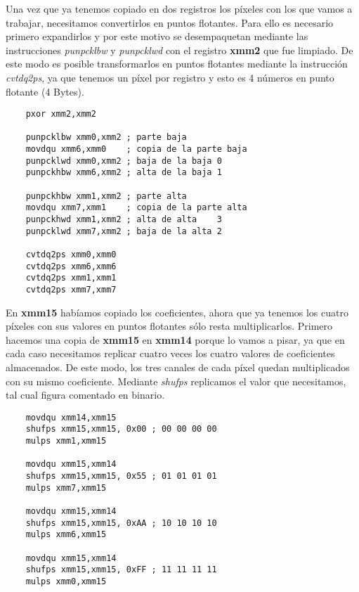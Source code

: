 \documentclass[a4paper]{article}
\begin{document}
\indent Una vez que ya tenemos copiado en dos registros los p\'ixeles con los que vamos a trabajar, necesitamos convertirlos en puntos flotantes. Para ello es necesario primero expandirlos y por este motivo se desempaquetan mediante las instrucciones \textit{punpcklbw} y \textit{punpcklwd} con el registro \textbf{xmm2} que fue limpiado. De este modo es posible transformarlos en puntos flotantes mediante la instrucci\'on \textit{cvtdq2ps}, ya que tenemos un p\'ixel por registro y esto es 4 n\'umeros en punto flotante (4 Bytes).
 \begin{codesnippet}
\begin{verbatim}
    pxor xmm2,xmm2

    punpcklbw xmm0,xmm2 ; parte baja 
    movdqu xmm6,xmm0    ; copia de la parte baja
    punpcklwd xmm0,xmm2 ; baja de la baja 0 
    punpckhbw xmm6,xmm2 ; alta de la baja 1

    punpckhbw xmm1,xmm2 ; parte alta           
    movdqu xmm7,xmm1    ; copia de la parte alta
    punpckhwd xmm1,xmm2 ; alta de alta    3
    punpcklwd xmm7,xmm2 ; baja de la alta 2

    cvtdq2ps xmm0,xmm0
    cvtdq2ps xmm6,xmm6
    cvtdq2ps xmm1,xmm1
    cvtdq2ps xmm7,xmm7
\end{verbatim}
\end{codesnippet}

\indent En \textbf{xmm15} hab\'iamos copiado los coeficientes, ahora que ya tenemos los cuatro p\'ixeles con sus valores en puntos flotantes s\'olo resta multiplicarlos. Primero hacemos una copia de \textbf{xmm15} en \textbf{xmm14} porque lo vamos a pisar, ya que en cada caso necesitamos replicar cuatro veces los cuatro valores de coeficientes almacenados. De este modo, los tres canales de cada p\'ixel quedan multiplicados con su mismo coeficiente. Mediante \textit{shufps} replicamos el valor que necesitamos, tal cual figura comentado en binario.
 \begin{codesnippet}
\begin{verbatim}
    movdqu xmm14,xmm15
    shufps xmm15,xmm15, 0x00 ; 00 00 00 00
    mulps xmm1,xmm15

    movdqu xmm15,xmm14
    shufps xmm15,xmm15, 0x55 ; 01 01 01 01 
    mulps xmm7,xmm15       
    
    movdqu xmm15,xmm14
    shufps xmm15,xmm15, 0xAA ; 10 10 10 10
    mulps xmm6,xmm15
    
    movdqu xmm15,xmm14
    shufps xmm15,xmm15, 0xFF ; 11 11 11 11
    mulps xmm0,xmm15
\end{verbatim}
\end{codesnippet}
\end{document}
